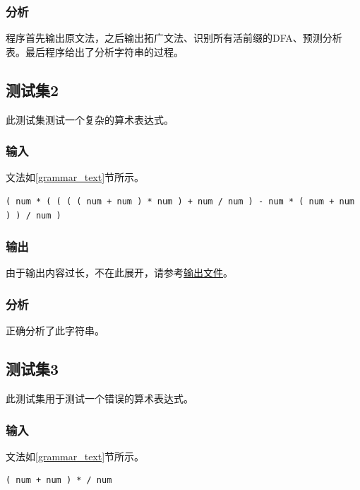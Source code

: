 \documentclass[lang=cn,11pt,a4paper,cite=authornum]{paper}
\begin{document}
\subsubsection{分析}

程序首先输出原文法，之后输出拓广文法、识别所有活前缀的DFA、预测分析表。最后程序给出了分析字符串的过程。

\subsection{测试集2}

此测试集测试一个复杂的算术表达式。

\subsubsection{输入}

文法如\ref{grammar_text}节所示。

\begin{code}
    \begin{verbatim}
( num * ( ( ( ( num + num ) * num ) + num / num ) - num * ( num + num ) ) / num )
\end{verbatim}
\end{code}

\subsubsection{输出}

由于输出内容过长，不在此展开，请参考\href{run:../test/result2.txt}{输出文件}。

\subsubsection{分析}

正确分析了此字符串。

\subsection{测试集3}

此测试集用于测试一个错误的算术表达式。

\subsubsection{输入}

文法如\ref{grammar_text}节所示。

\begin{code}
    \begin{verbatim}
( num + num ) * / num
\end{verbatim}
\end{code}
\end{document}
